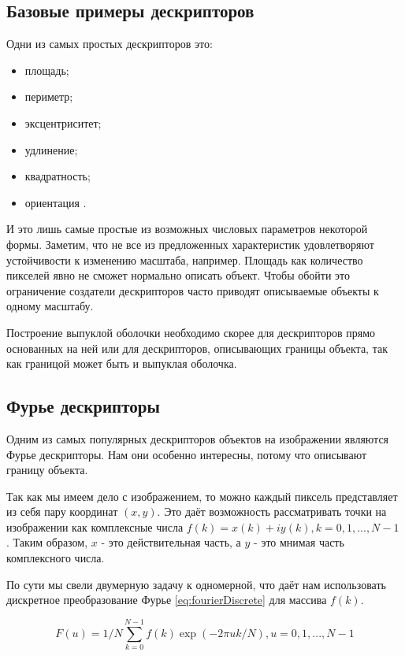 \subsection{Базовые примеры дескрипторов}

Одни из самых простых дескрипторов это:
\begin{itemize}
	\item площадь;
	\item периметр;
	\item эксцентриситет;
	\item удлинение;
	\item квадратность;
	\item ориентация \cite{morse2000lecture}.
\end{itemize}

И это лишь самые простые из возможных числовых параметров некоторой формы. Заметим, что не все из предложенных характеристик удовлетворяют устойчивости к изменению масштаба, например. Площадь как количество пикселей явно не сможет нормально описать объект. Чтобы обойти это ограничение создатели дескрипторов часто приводят описываемые объекты к одному масштабу.

Построение выпуклой оболочки необходимо скорее для дескрипторов прямо основанных на ней \cite{mathew2015content} или для дескрипторов, описывающих границы объекта, так как границой может быть и выпуклая оболочка.

\subsection{Фурье дескрипторы}

Одним из самых популярных дескрипторов объектов на изображении являются Фурье дескрипторы. Нам они особенно интересны, потому что описывают границу объекта.

Так как мы имеем дело с изображением, то можно каждый пиксель представляет из себя пару координат $(x, y)$. Это даёт возможность рассматривать точки на изображении как комплексные числа $f(k) = x(k) + iy(k), k = 0,1,...,N-1$ \cite{kolyuchkin2013visionAlgorithms}. Таким образом, $x$ - это действительная часть, а $y$ - это мнимая часть комплексного числа.

По сути мы свели двумерную задачу к одномерной, что даёт нам использовать дискретное преобразование Фурье \eqref{eq:fourierDiscrete} для массива $f(k)$.

\begin{equation}\label{eq:fourierDiscrete}
F(u) = 1/N \sum_{k=0}^{N-1} f(k) \exp(- 2\pi u k / N), u = 0,1,...,N-1
\end{equation}

